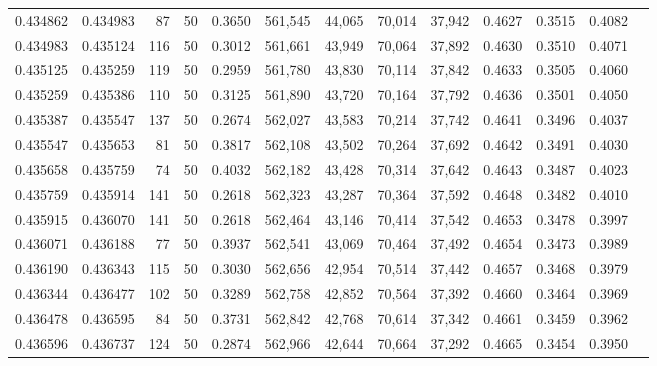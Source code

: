 \begin{tabular}{rrrrrrrrrrrrr}
0.434862 & 0.434983 &    87 &  50 &                                     0.3650 & 561,545 &  44,065 &  70,014 &  37,942 & 0.4627 & 0.3515 & 0.4082 \\
0.434983 & 0.435124 &   116 &  50 &                                     0.3012 & 561,661 &  43,949 &  70,064 &  37,892 & 0.4630 & 0.3510 & 0.4071 \\
0.435125 & 0.435259 &   119 &  50 &                                     0.2959 & 561,780 &  43,830 &  70,114 &  37,842 & 0.4633 & 0.3505 & 0.4060 \\
0.435259 & 0.435386 &   110 &  50 &                                     0.3125 & 561,890 &  43,720 &  70,164 &  37,792 & 0.4636 & 0.3501 & 0.4050 \\
0.435387 & 0.435547 &   137 &  50 &                                     0.2674 & 562,027 &  43,583 &  70,214 &  37,742 & 0.4641 & 0.3496 & 0.4037 \\
0.435547 & 0.435653 &    81 &  50 &                                     0.3817 & 562,108 &  43,502 &  70,264 &  37,692 & 0.4642 & 0.3491 & 0.4030 \\
0.435658 & 0.435759 &    74 &  50 &                                     0.4032 & 562,182 &  43,428 &  70,314 &  37,642 & 0.4643 & 0.3487 & 0.4023 \\
0.435759 & 0.435914 &   141 &  50 &                                     0.2618 & 562,323 &  43,287 &  70,364 &  37,592 & 0.4648 & 0.3482 & 0.4010 \\
0.435915 & 0.436070 &   141 &  50 &                                     0.2618 & 562,464 &  43,146 &  70,414 &  37,542 & 0.4653 & 0.3478 & 0.3997 \\
0.436071 & 0.436188 &    77 &  50 &                                     0.3937 & 562,541 &  43,069 &  70,464 &  37,492 & 0.4654 & 0.3473 & 0.3989 \\
0.436190 & 0.436343 &   115 &  50 &                                     0.3030 & 562,656 &  42,954 &  70,514 &  37,442 & 0.4657 & 0.3468 & 0.3979 \\
0.436344 & 0.436477 &   102 &  50 &                                     0.3289 & 562,758 &  42,852 &  70,564 &  37,392 & 0.4660 & 0.3464 & 0.3969 \\
0.436478 & 0.436595 &    84 &  50 &                                     0.3731 & 562,842 &  42,768 &  70,614 &  37,342 & 0.4661 & 0.3459 & 0.3962 \\
0.436596 & 0.436737 &   124 &  50 &                                     0.2874 & 562,966 &  42,644 &  70,664 &  37,292 & 0.4665 & 0.3454 & 0.3950 \\

\end{tabular}

